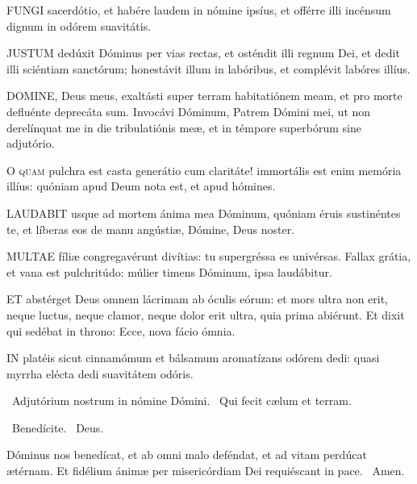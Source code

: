 \lettrine[lines=2]{F}{UNGI} sacerdótio, et habére laudem in nómine ipsíus, et offérre illi incénsum dignum in odórem suavitátis.


\lettrine[lines=2]{J}{USTUM} dedúxit Dóminus per vias rectas, et osténdit illi regnum Dei, et dedit illi sciéntiam sanctórum; honestávit illum in labóribus, et complévit labóres illíus.


\lettrine[lines=2]{D}{OMINE}, Deus meus, exaltásti super terram habitatiónem meam, et pro morte defluénte deprecáta sum. Invocávi Dóminum, Patrem Dómini mei, ut non derelínquat me in die tribulatiónis meæ, et in témpore superbórum sine adjutório.


\lettrine[lines=2]{O}{} \textsc{quam} pulchra est casta generátio cum claritáte! immortális est enim memória illíus: quóniam apud Deum nota est, et apud hómines.


\lettrine[lines=2]{L}{AUDABIT} usque ad mortem ánima mea Dóminum, quóniam éruis sustinéntes te, et líberas eos de manu angústiæ, Dómine, Deus noster.


\lettrine[lines=2]{M}{ULTAE} fíliæ congregavérunt divítias: tu supergréssa es univérsas. Fallax grátia, et vana est pulchritúdo: múlier timens Dóminum, ipsa laudábitur.


\lettrine[lines=2]{E}{T} abstérget Deus omnem lácrimam ab óculis eórum: et mors ultra non erit, neque luctus, neque clamor, neque dolor erit ultra, quia prima abiérunt. Et dixit qui sedébat in throno: Ecce, nova fácio ómnia.


\lettrine[lines=2]{I}{N} platéis sicut cinnamómum et bálsamum aromatízans odórem dedi: quasi myrrha elécta dedi suavitátem odóris.

\V\ Adjutórium nostrum in nómine Dómini. \R\ Qui fecit cælum et terram.

\V\ Benedícite. \R\ Deus.

 Dóminus nos benedícat, et ab omni malo deféndat, et ad vitam perdúcat ætérnam. Et fidélium ánimæ per misericórdiam Dei requiéscant in pace. \R\ Amen.

